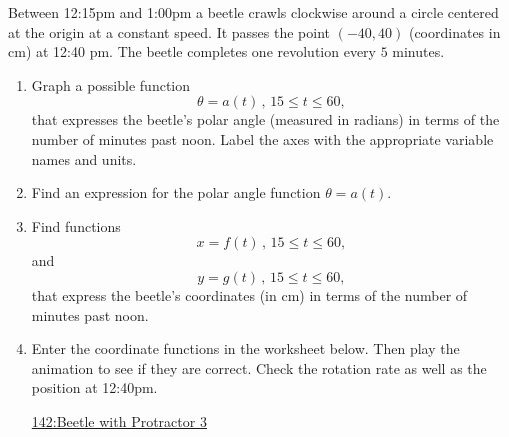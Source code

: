\documentclass{ximera}
\begin{document}
\begin{question}  \label{QLDFg4tbbfg}
Between 12:15pm and 1:00pm a beetle crawls clockwise around a circle centered at the origin at a constant speed. It passes the point $(-40,40)$ (coordinates in cm) at 12:40 pm. The beetle completes one revolution every $5$ minutes.

\begin{enumerate}
\item Graph a possible function
\[
 \theta = a(t) \, , \, 15\leq t \leq 60 ,
\]
that expresses the beetle's polar angle (measured in radians) in terms of the number of minutes past noon. Label the axes with the appropriate variable names and units.

\item Find an expression for the polar angle function $\theta = a(t)$.

\item Find functions
\[
     x = f(t) \, , \, 15 \leq t \leq 60,
\]
and
\[
     y = g(t) \, , \, 15 \leq t \leq 60,
\]
that express the beetle's coordinates (in cm) in terms of the number of minutes past noon.

\item Enter the coordinate functions in the worksheet below. Then play the animation to see if they are correct. Check the rotation rate as well as the position at 12:40pm.

\begin{onlineOnly}
    \begin{center}
\end{center}
\end{onlineOnly}

\href{https://www.desmos.com/calculator/vqlcelbo1v}{142:Beetle with Protractor 3}


\end{enumerate}
\end{question}
\end{document}
